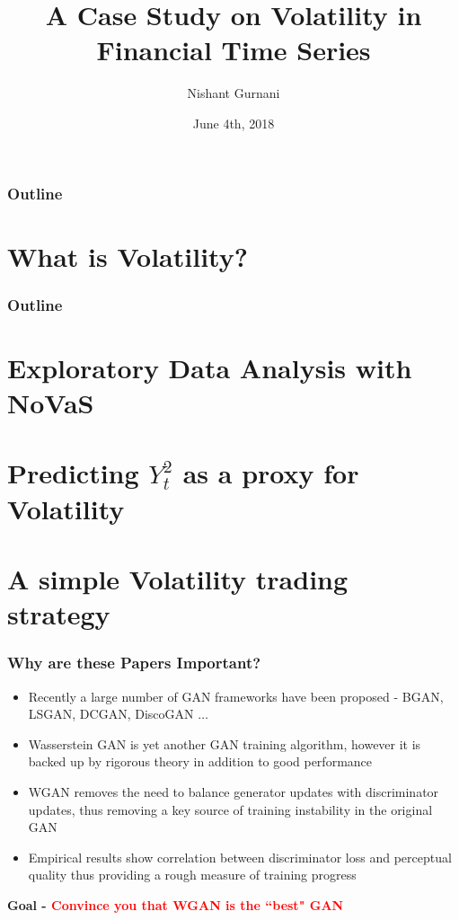 \documentclass{beamer}
\title[]{A Case Study on Volatility in Financial Time Series}
\author{Nishant Gurnani}
\date{June 4th, 2018}
\begin{document}
\begin{frame}
\titlepage
\end{frame}


\begin{frame}
\frametitle{Outline}
\tableofcontents
\end{frame}

\section{What is Volatility?}
\begin{frame}
\frametitle{Outline}
\tableofcontents[currentsection]
\end{frame}

\section{Exploratory Data Analysis with NoVaS}
\section{Predicting $Y_{t}^2$ as a proxy for Volatility}
\section{A simple Volatility trading strategy}





\begin{frame}
\frametitle{Why are these Papers Important?}
\begin{itemize}

\pause
\vspace{-20pt}
\item{Recently a large number of GAN frameworks have been proposed - BGAN, LSGAN, DCGAN, DiscoGAN $\dots$}
\pause
\item{Wasserstein GAN is yet another GAN training algorithm, however it is backed up by rigorous theory in addition to good performance}
\pause
\item{WGAN removes the need to balance generator updates with discriminator updates, thus removing a key source of training instability in the original GAN}
\pause
\item{Empirical results show correlation between discriminator loss and perceptual quality thus providing a rough measure of training progress}
\end{itemize}
\pause
\vspace{10pt}
\textbf{Goal - \textcolor{red} {Convince you that WGAN is the ``best" GAN}}
\end{frame}
\end{document}
